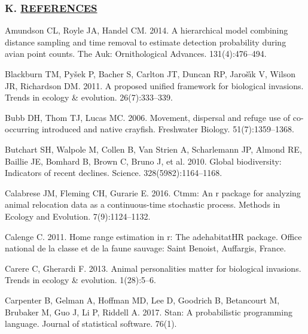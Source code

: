 \documentclass[
]{article}
\begin{document}
\hypertarget{k.-references}{%
\subsubsection*{\texorpdfstring{K.
\href{MyLibrary.bib}{REFERENCES}}{K. REFERENCES}}\label{k.-references}}

\hypertarget{refs}{}
\leavevmode\hypertarget{ref-amundson2014hierarchical}{}%
Amundson CL, Royle JA, Handel CM. 2014. A hierarchical model combining
distance sampling and time removal to estimate detection probability
during avian point counts. The Auk: Ornithological Advances.
131(4):476--494.

\leavevmode\hypertarget{ref-blackburn2011proposed}{}%
Blackburn TM, Pyšek P, Bacher S, Carlton JT, Duncan RP, Jarošı́k V,
Wilson JR, Richardson DM. 2011. A proposed unified framework for
biological invasions. Trends in ecology \& evolution. 26(7):333--339.

\leavevmode\hypertarget{ref-bubb2006movement}{}%
Bubb DH, Thom TJ, Lucas MC. 2006. Movement, dispersal and refuge use of
co-occurring introduced and native crayfish. Freshwater Biology.
51(7):1359--1368.

\leavevmode\hypertarget{ref-butchart2010global}{}%
Butchart SH, Walpole M, Collen B, Van Strien A, Scharlemann JP, Almond
RE, Baillie JE, Bomhard B, Brown C, Bruno J, et al. 2010. Global
biodiversity: Indicators of recent declines. Science.
328(5982):1164--1168.

\leavevmode\hypertarget{ref-calabrese2016ctmm}{}%
Calabrese JM, Fleming CH, Gurarie E. 2016. Ctmm: An r package for
analyzing animal relocation data as a continuous-time stochastic
process. Methods in Ecology and Evolution. 7(9):1124--1132.

\leavevmode\hypertarget{ref-calenge2011home}{}%
Calenge C. 2011. Home range estimation in r: The adehabitatHR package.
Office national de la classe et de la faune sauvage: Saint Benoist,
Auffargis, France.

\leavevmode\hypertarget{ref-carere2013animal}{}%
Carere C, Gherardi F. 2013. Animal personalities matter for biological
invasions. Trends in ecology \& evolution. 1(28):5--6.

\leavevmode\hypertarget{ref-carpenter2017stan}{}%
Carpenter B, Gelman A, Hoffman MD, Lee D, Goodrich B, Betancourt M,
Brubaker M, Guo J, Li P, Riddell A. 2017. Stan: A probabilistic
programming language. Journal of statistical software. 76(1).
\end{document}
